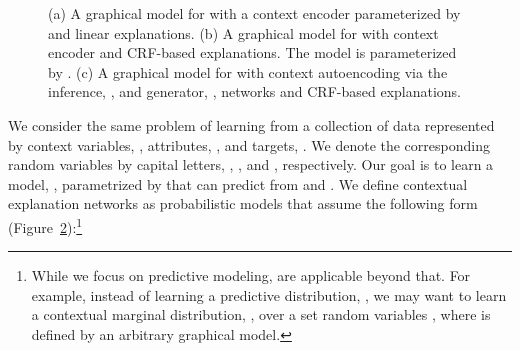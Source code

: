 \documentclass[twoside,11pt]{article}
\begin{document}
\begin{figure}[t]
\begin{subfigure}[b]{0.29\textwidth}
    \caption{}\label{fig:VCEN}
\end{subfigure}\caption{(a) A graphical model for {\CEN} with a context encoder parameterized by  and linear explanations.
(b) A graphical model for {\CEN} with context encoder and CRF-based explanations.
The model is parameterized by .
(c) A graphical model for {\CEN} with context autoencoding via the inference, , and generator, , networks and CRF-based explanations.}
\label{fig:PGM}
\end{figure}
 
We consider the same problem of learning from a collection of data represented by context variables, , attributes, , and targets, .
We denote the corresponding random variables by capital letters, , , and , respectively.
Our goal is to learn a model, , parametrized by  that can predict  from  and .
We define contextual explanation networks as probabilistic models that assume the following form (Figure~\ref{fig:PGM}):\footnote{While we focus on predictive modeling, {\CENs} are applicable beyond that.
For example, instead of learning a predictive distribution, , we may want to learn a contextual marginal distribution, , over a set random variables , where  is defined by an arbitrary graphical model.}
\end{document}

